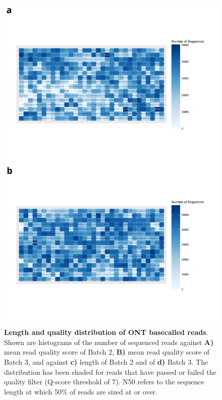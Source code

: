\begin{figure}[htp]
	\begin{center}
		\includegraphics[page=3,trim={0 0cm 0cm 10cm},clip, scale = 0.45]{Figures/ONTTargetedTranscriptome.pdf}
	\end{center}
	\captionsetup{width=0.95\textwidth}
	\caption[ONT read length and quality from Whole Transcriptome Sequencing ]%
	{\textbf{Length and quality distribution of ONT basecalled reads}. Shown are histograms of the number of sequenced reads against \textbf{A)} mean read quality score of Batch 2, \textbf{B)} mean read quality score of Batch 3, and against \textbf{c)} length of Batch 2 and of \textbf{d)} Batch 3. The distribution has been shaded for reads that have passed or failed the quality filter (Q-score threshold of 7). N50 refers to the sequence length at which 50\% of reads are sized at or over. }
	\label{fig:ont_targetedlengthquality}
\end{figure}

